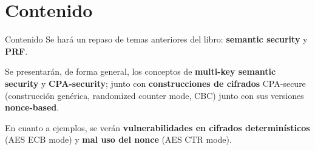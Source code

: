 \section{Contenido}
\begin{frame}{Contenido}
  Se hará un repaso de temas anteriores del libro: \textbf{semantic security} y \textbf{PRF}.

  Se presentarán, de forma general, los conceptos de \textbf{multi-key semantic security} y 
  \textbf{CPA-security}; junto con \textbf{construcciones de cifrados} CPA-secure
  (construcción genérica, randomized counter mode, CBC) junto con sus versiones \textbf{nonce-based}.

  En cuanto a ejemplos, se verán \textbf{vulnerabilidades en cifrados determinísticos} (AES ECB mode)
  y \textbf{mal uso del nonce} (AES CTR mode).
\end{frame}

